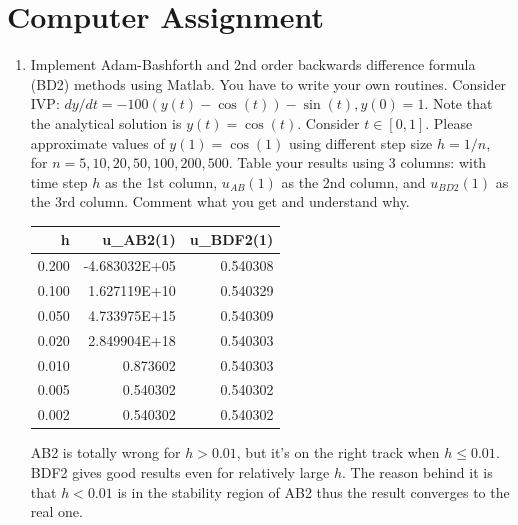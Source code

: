 \documentclass[10pt]{report}
\begin{document}
\section*{Computer Assignment}
\begin{enumerate}
	\item 
	Implement Adam-Bashforth and 2nd order backwards difference formula (BD2) methods using Matlab. You have to write your own routines. Consider IVP: $dy/dt = -100(y(t) - \cos(t)) - \sin(t), y(0) = 1$. Note that the analytical solution is $y(t) = \cos(t)$. Consider $t\in [0, 1]$. Please approximate values of $y(1) = \cos(1)$ using different step size $h = 1/n$, for $n = 5, 10, 20, 50, 100, 200, 500$. Table your results using 3 columns: with time step $h$ as the 1st column, $u_{AB}(1)$ as the 2nd column, and $u_{BD2}(1)$ as the 3rd column. Comment what you get and understand why.
	
	\begin{table}[H]
		\centering
		\begin{tabular}{*{3}{N}} 
			\toprule
			h & u_{AB2}(1) & u_{BDF2}(1) \\  & -4.683032E+05 & 0.540308\\
			0.100 & 1.627119E+10 & 0.540329\\
			0.050 & 4.733975E+15 & 0.540309\\
			0.020 & 2.849904E+18 & 0.540303\\
			0.010 & 0.873602 & 0.540303\\
			0.005 & 0.540302 & 0.540302\\
			0.002 & 0.540302 & 0.540302\\
			\bottomrule
		\end{tabular}
	\end{table}
	AB2 is totally wrong for $h>0.01$, but it's on the right track when $h\le 0.01$. BDF2 gives good results even for relatively large $h$. The reason behind it is that $h<0.01$ is in the stability region of AB2 thus the result converges to the real one.
	

\end{enumerate}
\end{document}
